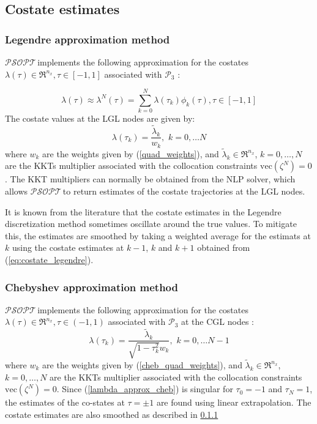 \documentclass[a4paper,11pt]{report}    %
\newcommand{\psopt}{$\mathcal{PSOPT}$\,}  %
\begin{document}
\subsection{Costate estimates} \label{sec:costates}

\subsubsection{Legendre approximation method} \label{sssec:legendre}

\psopt implements the following approximation for the costates $\lambda(\tau) \in \Re^{n_x}, \tau \in [-1,1]$ associated with $\mathcal{P}_3$ \cite{Fahroo:02}:

\begin{equation} \label{eq:costate_legendre}
  \lambda(\tau) \approx \lambda^{N}(\tau) = \sum_{k=0}^{N} \lambda(\tau_k) \phi_k(\tau), \tau \in [-1,1]
\end{equation}
The costate values at the LGL nodes are given by:
\begin{equation}
   \lambda(\tau_k)  = \frac{ \tilde \lambda_k }{ w_k}, \, \, k=0,\ldots N
\end{equation}
where $w_k$ are the weights given by (\ref{quad_weights}), and $\tilde \lambda_k \in \Re^{n_x}$, $k=0,\ldots,N$ are the KKTs multiplier associated with the collocation constraints $\mathrm{vec}(\zeta^N) = 0$. The KKT multipliers can normally be obtained from the NLP solver, which allows \psopt to return estimates of the costate trajectories at the LGL nodes.

It is known from the literature \cite{Fahroo:02} that the costate estimates in the Legendre discretization method sometimes oscillate around the true
values. To mitigate this, the estimates are smoothed by taking a weighted average for the estimats at $k$ using the costate estimates at $k-1$, $k$ and $k+1$
obtained from  (\ref{eq:costate_legendre}).

\subsubsection{Chebyshev approximation method}

\psopt implements the following approximation for the costates $\lambda(\tau) \in \Re^{n_x}, \tau \in (-1,1)$ associated with $\mathcal{P}_3$ 
at the CGL nodes \cite{Pietz:03}:
\begin{equation} \label{lambda_approx_cheb}
   \lambda(\tau_k)  = \frac{ \tilde \lambda_k }{\sqrt{1-\tau_k^2} w_k}, \, \, k=0,\ldots N-1
\end{equation}
where $w_k$ are the weights given by (\ref{cheb_quad_weights}), and $\tilde \lambda_k \in \Re^{n_x}$, $k=0,\ldots,N$ are the KKTs multiplier associated with the collocation constraints $\mathrm{vec}(\zeta^N) = 0$. Since (\ref{lambda_approx_cheb}) is singular for $\tau_0=-1$ and $\tau_N=1$, the estimates of the co-states at $\tau=\pm 1$ are found using linear extrapolation.
The costate estimates are also smoothed as described in \ref{sssec:legendre}
\end{document}

